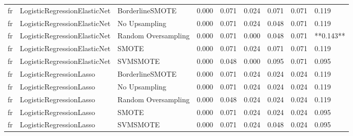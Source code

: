 \begin{tabular}{lllllllll}
      fr &    LogisticRegressionElasticNet &               BorderlineSMOTE &     0.000 &                     0.071 &                 0.024 &                  0.071 &                                   0.071 &     0.119 \\
      fr &    LogisticRegressionElasticNet &                 No Upsampling &     0.000 &                     0.071 &                 0.024 &                  0.048 &                                   0.071 &     0.119 \\
      fr &    LogisticRegressionElasticNet &           Random Oversampling &     0.000 &                     0.071 &                 0.000 &                  0.048 &                                   0.071 & **0.143** \\
      fr &    LogisticRegressionElasticNet &                         SMOTE &     0.000 &                     0.071 &                 0.024 &                  0.071 &                                   0.071 &     0.119 \\
      fr &    LogisticRegressionElasticNet &                      SVMSMOTE &     0.000 &                     0.048 &                 0.000 &                  0.095 &                                   0.071 &     0.095 \\
      fr &         LogisticRegressionLasso &               BorderlineSMOTE &     0.000 &                     0.071 &                 0.024 &                  0.024 &                                   0.024 &     0.119 \\
      fr &         LogisticRegressionLasso &                 No Upsampling &     0.000 &                     0.071 &                 0.024 &                  0.024 &                                   0.024 &     0.119 \\
      fr &         LogisticRegressionLasso &           Random Oversampling &     0.000 &                     0.048 &                 0.024 &                  0.024 &                                   0.024 &     0.119 \\
      fr &         LogisticRegressionLasso &                         SMOTE &     0.000 &                     0.071 &                 0.024 &                  0.024 &                                   0.024 &     0.095 \\
      fr &         LogisticRegressionLasso &                      SVMSMOTE &     0.000 &                     0.071 &                 0.024 &                  0.048 &                                   0.024 &     0.095 \\

\end{tabular}
